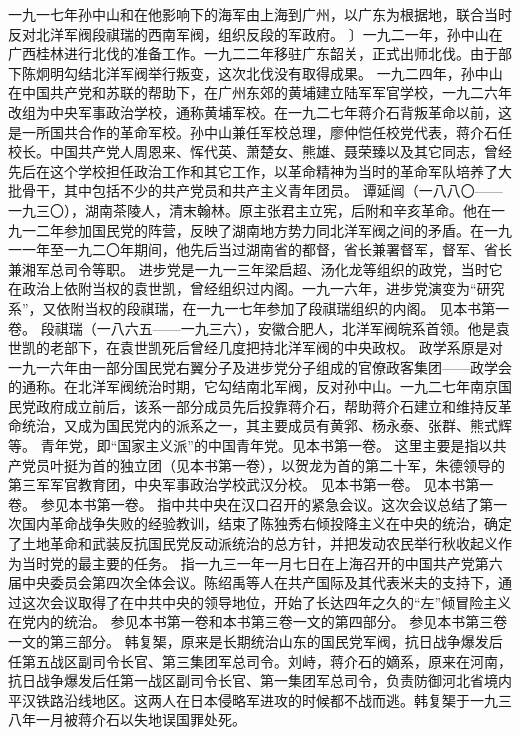 \begin{maonote}
一九一七年孙中山和在他影响下的海军由上海到广州，以广东为根据地，联合当时反对北洋军阀段祺瑞的西南军阀，组织反段的军政府。
〕一九二一年，孙中山在广西桂林进行北伐的准备工作。一九二二年移驻广东韶关，正式出师北伐。由于部下陈炯明勾结北洋军阀举行叛变，这次北伐没有取得成果。
一九二四年，孙中山在中国共产党和苏联的帮助下，在广州东郊的黄埔建立陆军军官学校，一九二六年改组为中央军事政治学校，通称黄埔军校。在一九二七年蒋介石背叛革命以前，这是一所国共合作的革命军校。孙中山兼任军校总理，廖仲恺任校党代表，蒋介石任校长。中国共产党人周恩来、恽代英、萧楚女、熊雄、聂荣臻以及其它同志，曾经先后在这个学校担任政治工作和其它工作，以革命精神为当时的革命军队培养了大批骨干，其中包括不少的共产党员和共产主义青年团员。
谭延闿（一八八〇——一九三〇），湖南茶陵人，清末翰林。原主张君主立宪，后附和辛亥革命。他在一九一二年参加国民党的阵营，反映了湖南地方势力同北洋军阀之间的矛盾。在一九一一年至一九二〇年期间，他先后当过湖南省的都督，省长兼署督军，督军、省长兼湘军总司令等职。
进步党是一九一三年梁启超、汤化龙等组织的政党，当时它在政治上依附当权的袁世凯，曾经组织过内阁。一九一六年，进步党演变为“研究系”，又依附当权的段祺瑞，在一九一七年参加了段祺瑞组织的内阁。
见本书第一卷。
段祺瑞（一八六五——一九三六），安徽合肥人，北洋军阀皖系首领。他是袁世凯的老部下，在袁世凯死后曾经几度把持北洋军阀的中央政权。
政学系原是对一九一六年由一部分国民党右翼分子及进步党分子组成的官僚政客集团——政学会的通称。在北洋军阀统治时期，它勾结南北军阀，反对孙中山。一九二七年南京国民党政府成立前后，该系一部分成员先后投靠蒋介石，帮助蒋介石建立和维持反革命统治，又成为国民党内的派系之一，其主要成员有黄郛、杨永泰、张群、熊式辉等。
青年党，即“国家主义派”的中国青年党。见本书第一卷。
这里主要是指以共产党员叶挺为首的独立团（见本书第一卷），以贺龙为首的第二十军，朱德领导的第三军军官教育团，中央军事政治学校武汉分校。
见本书第一卷。
见本书第一卷。
参见本书第一卷。
指中共中央在汉口召开的紧急会议。这次会议总结了第一次国内革命战争失败的经验教训，结束了陈独秀右倾投降主义在中央的统治，确定了土地革命和武装反抗国民党反动派统治的总方针，并把发动农民举行秋收起义作为当时党的最主要的任务。
指一九三一年一月七日在上海召开的中国共产党第六届中央委员会第四次全体会议。陈绍禹等人在共产国际及其代表米夫的支持下，通过这次会议取得了在中共中央的领导地位，开始了长达四年之久的“左”倾冒险主义在党内的统治。
参见本书第一卷和本书第三卷一文的第四部分。
参见本书第三卷一文的第三部分。
韩复榘，原来是长期统治山东的国民党军阀，抗日战争爆发后任第五战区副司令长官、第三集团军总司令。刘峙，蒋介石的嫡系，原来在河南，抗日战争爆发后任第一战区副司令长官、第一集团军总司令，负责防御河北省境内平汉铁路沿线地区。这两人在日本侵略军进攻的时候都不战而逃。韩复榘于一九三八年一月被蒋介石以失地误国罪处死。
\end{maonote}
